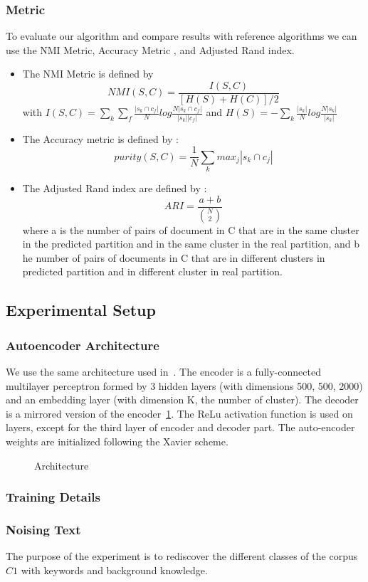 \subsubsection{Metric}
To evaluate our algorithm and compare results with reference algorithms we can
use the NMI Metric\cite{measure}, Accuracy Metric \cite{measure}, and Adjusted
Rand index\cite{measure}. 
\begin{itemize}
\item The NMI Metric is defined by
$$
NMI(S,C) = \frac{I(S,C)}{[H(S)+H(C)]/2}
$$ 
with
$
I(S,C) =\sum_k \sum_f\frac{|s_k \cap c_f|}{N}log\frac{N|s_k \cap c_f|}{|s_k| |c_f|}
$ and $
H(S) = -\sum_k\frac{|s_k|}{N}log\frac{N|s_k|}{|s_k|}
$
\item The Accuracy metric is defined by :
$$
purity(S,C) = \frac{1}{N}\sum_k {max}_j|s_k \cap c_j|
$$
\item The Adjusted Rand index are defined by :
  $$ARI = \frac{a+b}{\binom{N}{2}}$$
  where a is the number of pairs of document in C
  that are in the same cluster in the predicted partition and in the
  same cluster in the real partition, and b he number of pairs of
  documents in C that are in different clusters in predicted partition
  and in different cluster in real partition.
\end{itemize}
\subsection{Experimental Setup}
\subsubsection{Autoencoder Architecture}
We use the same architecture used in~\cite{Deap-K-Means}. The encoder is a fully-connected 
multilayer perceptron formed by 3 hidden layers (with dimensions 500, 500, 2000) 
 and an embedding layer (with dimension K, the number of cluster). 
The decoder is a mirrored version of the encoder~\ref{fig:archi}.
The ReLu activation function is used on layers, except for the third
layer of encoder and decoder part.  
The auto-encoder weights are initialized following the Xavier scheme.
\begin{figure}[!h]
  \centering
  
  \caption{\label{fig:archi}Architecture}
\end{figure}
\subsubsection{Training Details}
\subsubsection{Noising Text}
The purpose of the experiment is to rediscover the different classes of the
corpus $C1$ with keywords and background knowledge.

